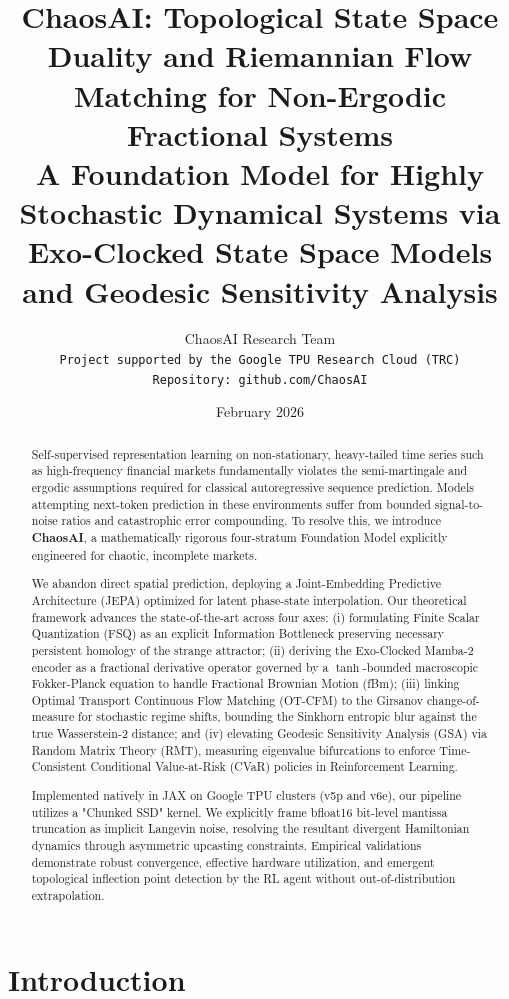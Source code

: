 \documentclass[11pt]{article}
\title{\textbf{ChaosAI: Topological State Space Duality and Riemannian Flow Matching for Non-Ergodic Fractional Systems}\\[0.6em]
\large A Foundation Model for Highly Stochastic Dynamical Systems via Exo-Clocked State Space Models and Geodesic Sensitivity Analysis}
\author{
  ChaosAI Research Team \\
  \texttt{Project supported by the Google TPU Research Cloud (TRC)} \\
  \texttt{Repository: github.com/ChaosAI}
}
\date{February 2026}
\begin{document}
\maketitle

\begin{abstract}
Self-supervised representation learning on non-stationary, heavy-tailed time series such as high-frequency financial markets fundamentally violates the semi-martingale and ergodic assumptions required for classical autoregressive sequence prediction. Models attempting next-token prediction in these environments suffer from bounded signal-to-noise ratios and catastrophic error compounding. To resolve this, we introduce \textbf{ChaosAI}, a mathematically rigorous four-stratum Foundation Model explicitly engineered for chaotic, incomplete markets. 

We abandon direct spatial prediction, deploying a Joint-Embedding Predictive Architecture (JEPA) optimized for latent phase-state interpolation. Our theoretical framework advances the state-of-the-art across four axes: (i) formulating Finite Scalar Quantization (FSQ) as an explicit Information Bottleneck preserving necessary persistent homology of the strange attractor; (ii) deriving the Exo-Clocked Mamba-2 encoder as a fractional derivative operator governed by a $\tanh$-bounded macroscopic Fokker-Planck equation to handle Fractional Brownian Motion (fBm); (iii) linking Optimal Transport Continuous Flow Matching (OT-CFM) to the Girsanov change-of-measure for stochastic regime shifts, bounding the Sinkhorn entropic blur against the true Wasserstein-2 distance; and (iv) elevating Geodesic Sensitivity Analysis (GSA) via Random Matrix Theory (RMT), measuring eigenvalue bifurcations to enforce Time-Consistent Conditional Value-at-Risk (CVaR) policies in Reinforcement Learning.

Implemented natively in JAX on Google TPU clusters (v5p and v6e), our pipeline utilizes a "Chunked SSD" kernel. We explicitly frame bfloat16 bit-level mantissa truncation as implicit Langevin noise, resolving the resultant divergent Hamiltonian dynamics through asymmetric upcasting constraints. Empirical validations demonstrate robust convergence, effective hardware utilization, and emergent topological inflection point detection by the RL agent without out-of-distribution extrapolation.
\end{abstract}

\newpage
\tableofcontents
\newpage

\section{Introduction}
\end{document}
